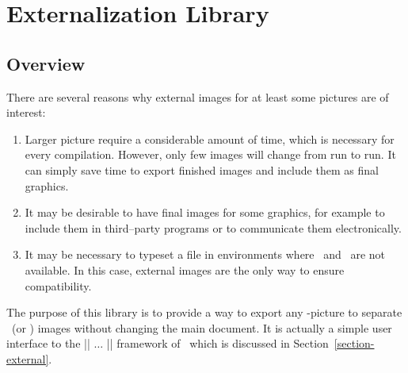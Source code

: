 %
%
%


\section{Externalization Library}
\label{section-libs-external}

{
{}



\subsection{Overview}

There are several reasons why external images for at least some pictures are of
interest:
%
\begin{enumerate}
    \item Larger picture require a considerable amount of time, which is
        necessary for every compilation. However, only few images will change
        from run to run. It can simply save time to export finished images and
        include them as final graphics.
    \item It may be desirable to have final images for some graphics, for
        example to include them in third--party programs or to communicate them
        electronically.
    \item It may be necessary to typeset a file in environments where \pgfname\
        and \tikzname\ are not available. In this case, external images are the
        only way to ensure compatibility.
\end{enumerate}
%
The purpose of this library is to provide a way to export any \tikzname-picture
to separate \pdf\ (or \eps) images without changing the main document. It is
actually a simple user interface to the |\beginpgfgraphicnamed| $\dotsc$
|\endpgfgraphicnamed| framework of \pgfname\ which is discussed in
Section~\ref{section-external}.


}
